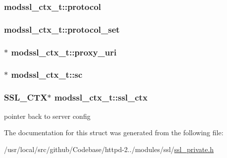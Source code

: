 \subsubsection[{\texorpdfstring{protocol}{protocol}}]{ modssl\+\_\+ctx\+\_\+t\+::protocol}\hypertarget{structmodssl__ctx__t_a2db939a3ce5333fe554908a69bb971e4}{}\label{structmodssl__ctx__t_a2db939a3ce5333fe554908a69bb971e4}
\subsubsection[{\texorpdfstring{protocol\+\_\+set}{protocol_set}}]{ modssl\+\_\+ctx\+\_\+t\+::protocol\+\_\+set}\hypertarget{structmodssl__ctx__t_a6b5bcd5e155bb9b911a49ca51aaa3848}{}\label{structmodssl__ctx__t_a6b5bcd5e155bb9b911a49ca51aaa3848}
\subsubsection[{\texorpdfstring{proxy\+\_\+uri}{proxy_uri}}]{$\ast$ modssl\+\_\+ctx\+\_\+t\+::proxy\+\_\+uri}\hypertarget{structmodssl__ctx__t_afdef1c118903213371baf62c899ca028}{}\label{structmodssl__ctx__t_afdef1c118903213371baf62c899ca028}
\subsubsection[{\texorpdfstring{sc}{sc}}]{$\ast$ modssl\+\_\+ctx\+\_\+t\+::sc}\hypertarget{structmodssl__ctx__t_a342be3370921b6346e4d3e6714f00105}{}\label{structmodssl__ctx__t_a342be3370921b6346e4d3e6714f00105}
\subsubsection[{\texorpdfstring{ssl\+\_\+ctx}{ssl_ctx}}]{\setlength{\rightskip}{0pt plus 5cm}S\+S\+L\+\_\+\+C\+TX$\ast$ modssl\+\_\+ctx\+\_\+t\+::ssl\+\_\+ctx}\hypertarget{structmodssl__ctx__t_a55d4073e2040508eaf1994518c37a58f}{}\label{structmodssl__ctx__t_a55d4073e2040508eaf1994518c37a58f}
pointer back to server config 

The documentation for this struct was generated from the following file\+:\begin{DoxyCompactItemize}
\item 
/usr/local/src/github/\+Codebase/httpd-\/2../modules/ssl/\hyperlink{ssl__private_8h}{ssl\+\_\+private.\+h}\end{DoxyCompactItemize}
